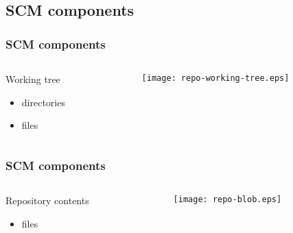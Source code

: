 \documentclass[english]{beamer}
\newcommand{\mysubsection}[2]{%
  \hypertarget{#2}{}%
  \subsection{#1}%
  \label{#2}%
}
\begin{document}
\mysubsection{SCM components}{concepts:components}
\begin{frame}
\frametitle{SCM components}
\begin{columns}[t]
        \begin{column}[T]{.5\textwidth}
                Working tree
                \begin{itemize}
                        \item directories
                        \item files
                \end{itemize}

        \end{column}
        \begin{column}[T]{.5\textwidth}
                \vspace{.2\textheight}
                \texttt{[image: repo-working-tree.eps]}
        \end{column}
\end{columns}

\end{frame}

\begin{frame}
\frametitle{SCM components}
\begin{columns}[t]
        \begin{column}[T]{.5\textwidth}
                Repository contents
                \begin{itemize}
                        \item files
                \end{itemize}
        \end{column}
        \begin{column}[T]{.5\textwidth}
                \vspace{.2\textheight}
                \texttt{[image: repo-blob.eps]}
        \end{column}
\end{columns}

\end{frame}
\end{document}
